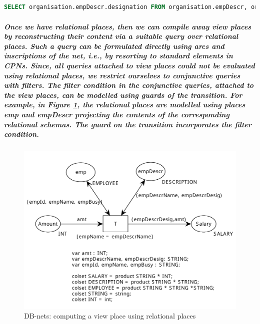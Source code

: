 \subparagraph*{}
\begin{lstlisting}[showstringspaces=false, language = SQL]
SELECT organisation.empDescr.designation FROM organisation.empDescr, organisation.emp WHERE organisation.empDescr.name = organisation.emp.name;
\end{lstlisting}

\subparagraph*{\textnormal{Once	we have relational places, then we can compile away view places by reconstructing their content via a suitable query over relational places. Such a query can be formulated directly using arcs and inscriptions of the net, i.e., by resorting to standard elements in CPNs. Since, all queries attached to view places could not be evaluated using relational places, we restrict ourselves to conjunctive queries with filters. The filter condition in the conjunctive queries, attached to the view places, can be modelled using guards of the transition. For example, in Figure \ref{fig:DBN_SS_Relational_Place_1}, the relational places are modelled using places \textit{emp} and \textit{empDescr} projecting the contents of the corresponding relational schemas. The guard on the transition incorporates the filter condition.}}
\begin{figure}[h]
	\centering
	\includegraphics[scale = 0.50]{DBN_SS_Relational_Place_1.pdf}
	\caption{DB-nets: computing a view place using relational places}
	\label{fig:DBN_SS_Relational_Place_1}
\end{figure}

